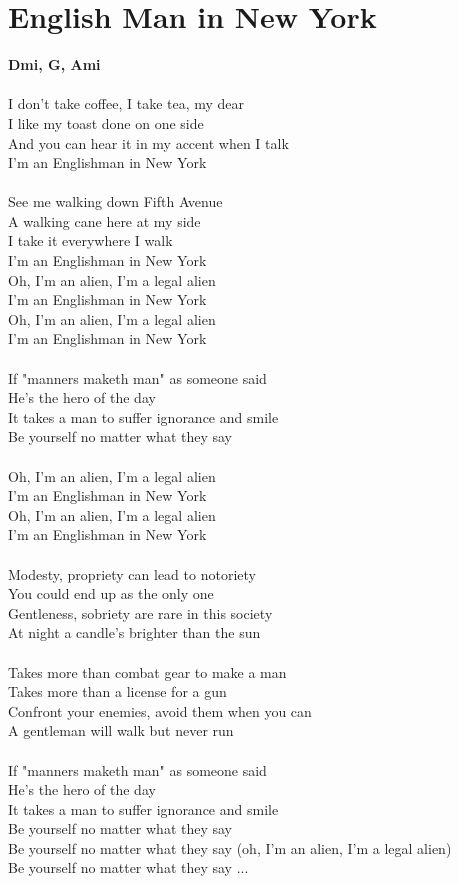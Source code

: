 \section{English Man in New York}
\footnotesize\textbf{Dmi, G, Ami}\\
\\
\normalsize
I don't take coffee, I take tea, my dear\\
I like my toast done on one side\\
And you can hear it in my accent when I talk\\
I'm an Englishman in New York\\
\\
See me walking down Fifth Avenue\\
A walking cane here at my side\\
I take it everywhere I walk\\
I'm an Englishman in New York\\

Oh, I'm an alien, I'm a legal alien\\
I'm an Englishman in New York\\
Oh, I'm an alien, I'm a legal alien\\
I'm an Englishman in New York\\
\\
If "manners maketh man" as someone said\\
He's the hero of the day\\
It takes a man to suffer ignorance and smile\\
Be yourself no matter what they say\\
\\
Oh, I'm an alien, I'm a legal alien\\
I'm an Englishman in New York\\
Oh, I'm an alien, I'm a legal alien\\
I'm an Englishman in New York\\
\\
Modesty, propriety can lead to notoriety\\
You could end up as the only one\\
Gentleness, sobriety are rare in this society\\
At night a candle's brighter than the sun\\
\\
Takes more than combat gear to make a man\\
Takes more than a license for a gun\\
Confront your enemies, avoid them when you can\\
A gentleman will walk but never run\\
\\
If "manners maketh man" as someone said\\
He's the hero of the day\\
It takes a man to suffer ignorance and smile\\
Be yourself no matter what they say\\
Be yourself no matter what they say (oh, I'm an alien, I'm a legal alien)\\
Be yourself no matter what they say ...